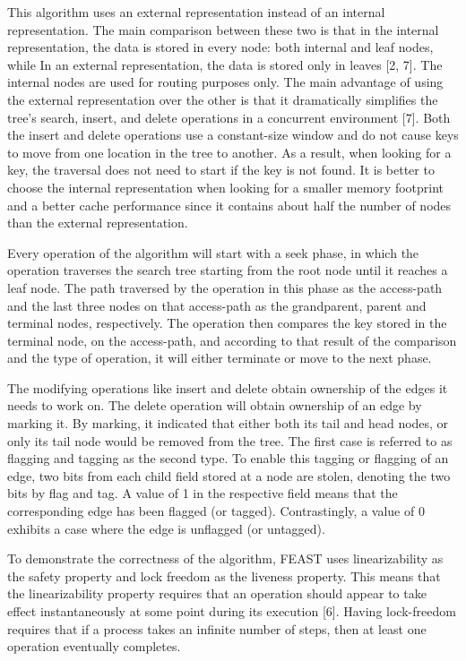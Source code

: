 \documentclass[conference]{IEEEtran}
\begin{document}
This algorithm uses an external representation instead of an internal representation. The main comparison between these two is that in the internal representation, the data is stored in every node: both internal and leaf nodes, while In an external representation, the data is stored only in leaves [2, 7]. The internal nodes are used for routing purposes only. The main advantage of using the external representation over the other is that it dramatically simplifies the tree's search, insert, and delete operations in a concurrent environment [7]. Both the insert and delete operations use a constant-size window and do not cause keys to move from one location in the tree to another. As a result, when looking for a key, the traversal does not need to start if the key is not found. It is better to choose the internal representation when looking for a smaller memory footprint and a better cache performance since it contains about half the number of nodes than the external representation.

Every operation of the algorithm will start with a seek phase, in which the operation traverses the search tree starting from the root node until it reaches a leaf node. The path traversed by the operation in this phase as the access-path and the last three nodes on that access-path as the grandparent, parent and terminal nodes, respectively. The operation then compares the key stored in the terminal node, on the access-path, and according to that result of the comparison and the type of operation, it will either terminate or move to the next phase.

The modifying operations like insert and delete obtain ownership of the edges it needs to work on. The delete operation will obtain ownership of an edge by marking it. By marking, it indicated that either both its tail and head nodes, or only its tail node would be removed from the tree. The first case is referred to as flagging and tagging as the second type. To enable this tagging or flagging of an edge, two bits from each child field stored at a node are stolen, denoting the two bits by flag and tag. A value of 1 in the respective field means that the corresponding edge has been flagged (or tagged). Contrastingly, a value of 0 exhibits a case where the edge is unflagged (or untagged).

To demonstrate the correctness of the algorithm, FEAST uses linearizability as the safety property and lock freedom as the liveness property. This means that the linearizability property requires that an operation should appear to take effect instantaneously at some point during its execution [6]. Having lock-freedom requires that if a process takes an infinite number of steps, then at least one operation eventually completes.
\end{document}
